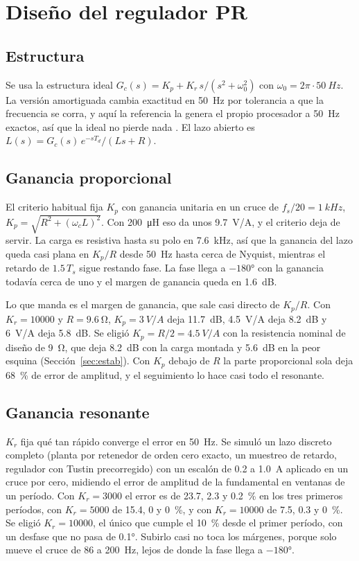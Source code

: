 \documentclass[journal]{IEEEtran}
\begin{document}
\section{Diseño del regulador PR}
\label{sec:pr}

\subsection{Estructura}
\label{sec:estructura}
Se usa la estructura ideal $G_c(s)=K_p+K_r\,s/(s^2+\omega_0^2)$ con $\omega_0=2\pi\cdot\SI{50}{Hz}$. La versión amortiguada cambia exactitud en \SI{50}{Hz} por tolerancia a que la frecuencia se corra, y aquí la referencia la genera el propio procesador a \SI{50}{Hz} exactos, así que la ideal no pierde nada \cite{teodorescu2006,zmood2003}. El lazo abierto es $L(s)=G_c(s)\,e^{-sT_d}/(Ls+R)$.

\subsection{Ganancia proporcional}
\label{sec:kp}
El criterio habitual fija $K_p$ con ganancia unitaria en un cruce de $f_s/20=\SI{1}{kHz}$, $K_p=\sqrt{R^2+(\omega_cL)^2}$. Con \SI{200}{\micro H} eso da unos \SI{9.7}{V/A}, y el criterio deja de servir. La carga es resistiva hasta su polo en \SI{7.6}{kHz}, así que la ganancia del lazo queda casi plana en $K_p/R$ desde \SI{50}{Hz} hasta cerca de Nyquist, mientras el retardo de $1.5\,T_s$ sigue restando fase. La fase llega a $-\ang{180}$ con la ganancia todavía cerca de uno y el margen de ganancia queda en \SI{1.6}{dB}.

Lo que manda es el margen de ganancia, que sale casi directo de $K_p/R$. Con $K_r=\num{10000}$ y $R=\SI{9.6}{\ohm}$, $K_p=\SI{3}{V/A}$ deja \SI{11.7}{dB}, \SI{4.5}{V/A} deja \SI{8.2}{dB} y \SI{6}{V/A} deja \SI{5.8}{dB}. Se eligió $K_p=R/2=\SI{4.5}{V/A}$ con la resistencia nominal de diseño de \SI{9}{\ohm}, que deja \SI{8.2}{dB} con la carga montada y \SI{5.6}{dB} en la peor esquina (Sección~\ref{sec:estab}). Con $K_p$ debajo de $R$ la parte proporcional sola deja \SI{68}{\percent} de error de amplitud, y el seguimiento lo hace casi todo el resonante.

\subsection{Ganancia resonante}
\label{sec:kr}
$K_r$ fija qué tan rápido converge el error en \SI{50}{Hz}. Se simuló un lazo discreto completo (planta por retenedor de orden cero exacto, un muestreo de retardo, regulador con Tustin precorregido) con un escalón de \num{0.2} a \SI{1.0}{A} aplicado en un cruce por cero, midiendo el error de amplitud de la fundamental en ventanas de un período. Con $K_r=3000$ el error es de \num{23.7}, \num{2.3} y \SI{0.2}{\percent} en los tres primeros períodos, con $K_r=5000$ de \num{15.4}, \num{0} y \SI{0}{\percent}, y con $K_r=\num{10000}$ de \num{7.5}, \num{0.3} y \SI{0}{\percent}. Se eligió $K_r=\num{10000}$, el único que cumple el \SI{10}{\percent} desde el primer período, con un desfase que no pasa de \ang{0.1}. Subirlo casi no toca los márgenes, porque solo mueve el cruce de \num{86} a \SI{200}{Hz}, lejos de donde la fase llega a $-\ang{180}$.
\end{document}
